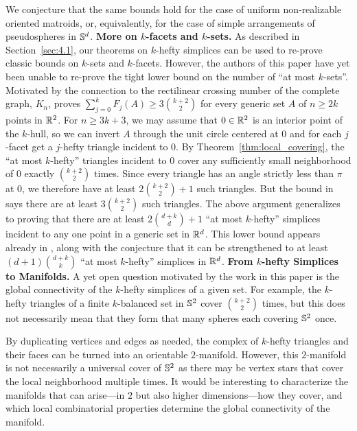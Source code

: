 \documentclass[a4paper,UKenglish,cleveref, autoref,numberwithinsect]{socg-lipics-v2021}
\newcommand {\mm}[1] {\ifmmode{#1}\else{\mbox{\(#1\)}}\fi}
\theoremstyle{plain}
\newcommand{\Rspace}        {\mm{{\mathbb R}}}
\newcommand{\Sspace}        {\mm{{\mathbb S}}}
\begin{document}
\smallskip
We conjecture that the same bounds hold for the case of uniform non-realizable oriented matroids, or, equivalently, for the case of simple arrangements of pseudospheres in $\Sspace^d$.
\medskip \noindent
\textbf{More on $k$-facets and $k$-sets.}
As described in Section~\ref{sec:4.1}, our theorems on $k$-hefty simplices can be used to re-prove classic bounds on $k$-sets and $k$-facets.
However, the authors of this paper have yet been unable to re-prove the tight lower bound on the number of ``at most $k$-sets''.
Motivated by the connection to the rectilinear crossing number of the complete graph, $K_n$, \cite{LVWW04} proves $\sum_{j=0}^k F_j(A) \geq 3 \binom{k+2}{2}$ for every generic set $A$ of $n \geq 2k$ points in $\Rspace^2$.
For $n \geq 3k+3$, we may assume that $0 \in \Rspace^2$ is an interior point of the $k$-hull, so we can invert $A$ through the unit circle centered at $0$ and for each $j$-facet get a $j$-hefty triangle incident to $0$.
By Theorem~\ref{thm:local_covering}, the ``at most $k$-hefty'' triangles incident to $0$ cover any sufficiently small neighborhood of $0$ exactly $\binom{k+2}{2}$ times.
Since every triangle has an angle strictly less than $\pi$ at $0$, we therefore have at least $2 \binom{k+2}{2} + 1$ such triangles.
But the bound in \cite{LVWW04} says there are at least $3 \binom{k+2}{2}$ such triangles.
\smallskip
The above argument generalizes to proving that there are at least $2 \binom{d+k}{d} + 1$ ``at most $k$-hefty'' simplices incident to any one point in a generic set in $\Rspace^d$.
This lower bound appears already in \cite[Theorem~6.3]{Wag03}, along with the conjecture that it can be strengthened to at least $(d+1) \binom{d+k}{k}$ ``at most $k$-hefty'' simplices in $\Rspace^d$.
\medskip \noindent
\textbf{From $k$-hefty Simplices to Manifolds.}
A yet open question motivated by the work in this paper is the global connectivity of the $k$-hefty simplices of a given set.
For example, the $k$-hefty triangles of a finite $k$-balanced set in $\Sspace^2$ cover $\binom{k+2}{2}$ times, but this does not necessarily mean that they form that many spheres each covering $\Sspace^2$ once.
 
  
\smallskip
By duplicating vertices and edges as needed, the complex of $k$-hefty triangles and their faces can be turned into an orientable $2$-manifold.
However, this $2$-manifold is not necessarily a universal cover of $\Sspace^2$ as there may be vertex stars that cover the local neighborhood multiple times.
It would be interesting to characterize the manifolds that can arise---in $2$ but also higher dimensions---how they cover, and which local combinatorial properties determine the global connectivity of the manifold.
\end{document}
